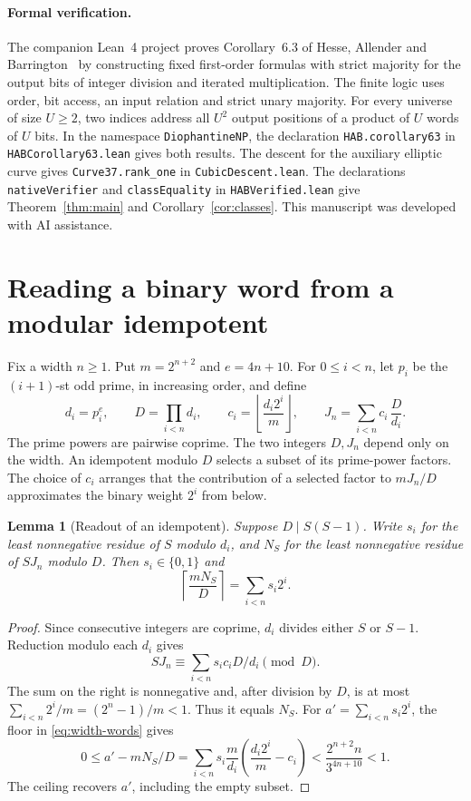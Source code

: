 \documentclass[11pt,letterpaper]{article}
\newtheorem{lemma}[theorem]{Lemma}
\numberwithin{equation}{section}
\begin{document}
\paragraph{Formal verification.}
The companion Lean~4 project proves Corollary~6.3 of Hesse, Allender and Barrington~\cite{hab} by constructing fixed first-order formulas with strict majority for the output bits of integer division and iterated multiplication. The finite logic uses order, bit access, an input relation and strict unary majority. For every universe of size $U\ge2$, two indices address all $U^2$ output positions of a product of $U$ words of $U$ bits. In the namespace \texttt{DiophantineNP}, the declaration \texttt{HAB.corollary63} in \texttt{HABCorollary63.lean} gives both results. The descent for the auxiliary elliptic curve gives \texttt{Curve37.rank\_one} in \texttt{CubicDescent.lean}. The declarations \texttt{nativeVerifier} and \texttt{classEquality} in \texttt{HABVerified.lean} give Theorem~\ref{thm:main} and Corollary~\ref{cor:classes}. This manuscript was developed with AI assistance.

{\small\tableofcontents}
\clearpage

\section{Reading a binary word from a modular idempotent}\label{sec:residues}

Fix a width \(n\ge1\). Put \(m=2^{n+2}\) and \(e=4n+10\). For
\(0\le i<n\), let \(p_i\) be the \((i+1)\)-st odd prime, in increasing
order, and define
\begin{equation}\label{eq:width-words}
 d_i=p_i^e,\qquad D=\prod_{i<n}d_i,\qquad
 c_i=\left\lfloor\frac{d_i2^i}{m}\right\rfloor,\qquad
 J_n=\sum_{i<n} c_i\,\frac{D}{d_i}.
\end{equation}
The prime powers are pairwise coprime. The two integers \(D,J_n\) depend
only on the width. An idempotent modulo \(D\) selects a subset of its
prime-power factors. The choice of \(c_i\) arranges that the contribution
of a selected factor to \(mJ_n/D\) approximates the binary weight \(2^i\)
from below.

\begin{lemma}[Readout of an idempotent]\label{lem:read}
Suppose \(D\mid S(S-1)\). Write \(s_i\) for the least nonnegative
residue of \(S\) modulo \(d_i\), and \(N_S\) for the least nonnegative
residue of \(SJ_n\) modulo \(D\). Then \(s_i\in\{0,1\}\) and
\[
                    \left\lceil\frac{mN_S}{D}\right\rceil
                       =\sum_{i<n}s_i2^i .
\]
\end{lemma}
\begin{proof}
Since consecutive integers are coprime, \(d_i\) divides either \(S\) or
\(S-1\). Reduction modulo each \(d_i\) gives
\[
 SJ_n\equiv\sum_{i<n}s_ic_iD/d_i\pmod D.
\]
The sum on the right is nonnegative and, after division by \(D\), is at
most \(\sum_{i<n}2^i/m=(2^n-1)/m<1\). Thus it equals \(N_S\). For
\(a'=\sum_{i<n}s_i2^i\), the floor in \eqref{eq:width-words} gives
\[
 0\le a'-mN_S/D
   =\sum_{i<n}s_i\frac{m}{d_i}
             \left(\frac{d_i2^i}{m}-c_i\right)
   <\frac{2^{n+2}n}{3^{4n+10}}<1 .
\]
The ceiling recovers \(a'\), including the empty subset.
\end{proof}
\end{document}
